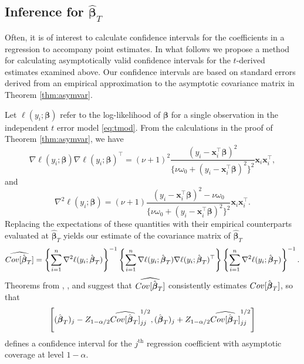 \documentclass[12pt]{article}
\newcommand{\Cov}[1]{{\rm{Cov}}[ #1 ]}
\newcommand{\bl}[1]{{\mathbf #1}}
\newcommand{\bs}[1]{\boldsymbol #1}
\begin{document}
\subsection{Inference for $\hat{\bs{\beta}}_T$}\label{sec:inf}

Often, it is of interest to calculate confidence intervals for the coefficients in a regression to accompany point estimates. In what follows we propose a method for calculating asymptotically valid confidence intervals for the $t$-derived estimates examined above. Our confidence intervals are based on standard errors derived from an empirical approximation to the asymptotic covariance matrix in Theorem \ref{thm:asymvar}.

Let $\ell(y_i ; \bs{\beta})$ refer to the log-likelihood of $\bs{\beta}$ for a single observation in the independent $t$ error model \eqref{eq:tmod}. From the calculations in the proof of Theorem \ref{thm:asymvar}, we have
\begin{equation*}
    \nabla \ell(y_i ; \bs{\beta}) \nabla \ell(y_i ; \bs{\beta})^\top = (\nu+1)^2 \frac{(y_i - \bl{x}_i^\top \bs{\beta})^2}{\{\nu \omega_0 + (y_i - \bl{x}_i^\top \bs{\beta})^2\}^2 } \bl{x}_i \bl{x}_i^\top,
\end{equation*}
and
\begin{equation*}
    \nabla^2 \ell(y_i ; \bs{\beta}) =(\nu+1) \frac{(y_i - \bl{x}_i^\top \bs{\beta})^2 - \nu \omega_0}{\{\nu \omega_0 + (y_i - \bl{x}_i^\top \bs{\beta})^2\}^2} \bl{x}_i \bl{x}_i^\top.
\end{equation*}
Replacing the expectations of these quantities with their empirical counterparts evaluated at $\hat{\bs{\beta}}_T$ yields our estimate of the covariance matrix of $\hat{\bs{\beta}}_T$
\begin{equation*}
    \widehat{\Cov{\hat{\bs{\beta}}_T}} = \left\{ \sum_{i=1}^n \nabla^2 \ell(y_i ; \hat{\bs{\beta}}_T) \right\}^{-1}\left\{\sum_{i=1}^n \nabla \ell(y_i ; \hat{\bs{\beta}}_T) \nabla \ell(y_i ; \hat{\bs{\beta}}_T)^\top \right\} \left\{ \sum_{i=1}^n \nabla^2 \ell(y_i ; \hat{\bs{\beta}}_T) \right\}^{-1}.
\end{equation*}
Theorems from \cite{hoadley_asymptotic_1971}, \cite{white_nonlinear_1980}, and \cite{iverson_effects_1989} suggest that $\widehat{\Cov{\hat{\bs{\beta}}_T}}$ consistently estimates $\Cov{\hat{\bs{\beta}}_T}$, so that
\begin{equation*}
    \left[(\hat{\bs{\beta}}_T)_j - Z_{1-\alpha/2} \widehat{\Cov{\hat{\bs{\beta}}_T}}_{jj}^{1/2}, (\hat{\bs{\beta}}_T)_j + Z_{1-\alpha/2} \widehat{\Cov{\hat{\bs{\beta}}_T}}_{jj}^{1/2}\right]
\end{equation*}
defines a confidence interval for the $j^\mathrm{th}$ regression coefficient with asymptotic coverage at level $1 - \alpha$.
\end{document}
